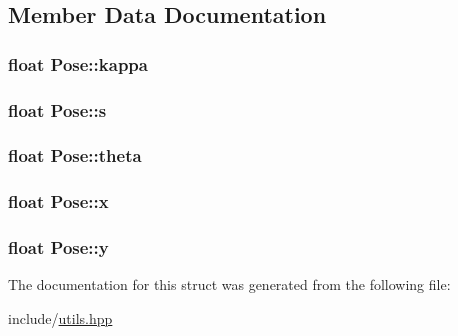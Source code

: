 \subsection{Member Data Documentation}
\subsubsection[{\texorpdfstring{kappa}{kappa}}]{\setlength{\rightskip}{0pt plus 5cm}float Pose\+::kappa}\hypertarget{structPose_a4f409e1fe4ae5626042bc2942df9367a}{}\label{structPose_a4f409e1fe4ae5626042bc2942df9367a}
\subsubsection[{\texorpdfstring{s}{s}}]{\setlength{\rightskip}{0pt plus 5cm}float Pose\+::s}\hypertarget{structPose_a7cafd5a1122c053e9c1ddec351dbb8f3}{}\label{structPose_a7cafd5a1122c053e9c1ddec351dbb8f3}
\subsubsection[{\texorpdfstring{theta}{theta}}]{\setlength{\rightskip}{0pt plus 5cm}float Pose\+::theta}\hypertarget{structPose_a2e2edc8448a8f6f4a21cbd7eca63c2ff}{}\label{structPose_a2e2edc8448a8f6f4a21cbd7eca63c2ff}
\subsubsection[{\texorpdfstring{x}{x}}]{\setlength{\rightskip}{0pt plus 5cm}float Pose\+::x}\hypertarget{structPose_a2f30fe76d6747d973daff013207ca0e8}{}\label{structPose_a2f30fe76d6747d973daff013207ca0e8}
\subsubsection[{\texorpdfstring{y}{y}}]{\setlength{\rightskip}{0pt plus 5cm}float Pose\+::y}\hypertarget{structPose_a60610dad0457edf9e1c57a787b68b632}{}\label{structPose_a60610dad0457edf9e1c57a787b68b632}


The documentation for this struct was generated from the following file\+:\begin{DoxyCompactItemize}
\item 
include/\hyperlink{utils_8hpp}{utils.\+hpp}\end{DoxyCompactItemize}
